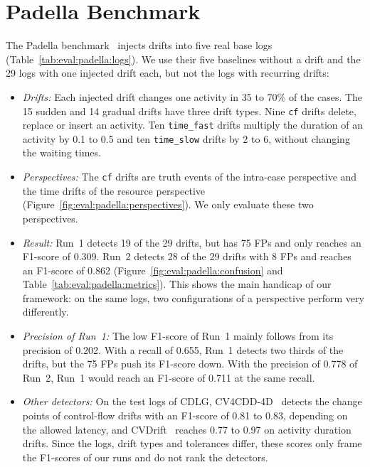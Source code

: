 \section{Padella Benchmark}
\label{sec:eval:padella}
The Padella benchmark~\autocite{padella2026everything} injects drifts into five real base logs (Table~\ref{tab:eval:padella:logs}). We use their five baselines without a drift and the 29 logs with one injected drift each, but not the logs with recurring drifts:
\begin{itemize}
	\item \emph{Drifts:} Each injected drift changes one activity in 35 to 70\% of the cases. The 15 sudden and 14 gradual drifts have three drift types. Nine \texttt{cf} drifts delete, replace or insert an activity. Ten \texttt{time\_fast} drifts multiply the duration of an activity by 0.1 to 0.5 and ten \texttt{time\_slow} drifts by 2 to 6, without changing the waiting times.
	\item \emph{Perspectives:} The \texttt{cf} drifts are truth events of the intra-case perspective and the time drifts of the resource perspective (Figure~\ref{fig:eval:padella:perspectives}). We only evaluate these two perspectives.
	\item \emph{Result:} Run~1 detects 19 of the 29 drifts, but has 75 FPs and only reaches an F1-score of 0.309. Run~2 detects 28 of the 29 drifts with 8 FPs and reaches an F1-score of 0.862 (Figure~\ref{fig:eval:padella:confusion} and Table~\ref{tab:eval:padella:metrics}). This shows the main handicap of our framework: on the same logs, two configurations of a perspective perform very differently.
	\item \emph{Precision of Run~1:} The low F1-score of Run~1 mainly follows from its precision of 0.202. With a recall of 0.655, Run~1 detects two thirds of the drifts, but the 75 FPs push its F1-score down. With the precision of 0.778 of Run~2, Run~1 would reach an F1-score of 0.711 at the same recall.
	\item \emph{Other detectors:} On the test logs of CDLG, CV4CDD-4D~\autocite{kraus2025machine} detects the change points of control-flow drifts with an F1-score of 0.81 to 0.83, depending on the allowed latency, and CVDrift~\autocite{khraiwesh2027window} reaches 0.77 to 0.97 on activity duration drifts. Since the logs, drift types and tolerances differ, these scores only frame the F1-scores of our runs and do not rank the detectors.
\end{itemize}

